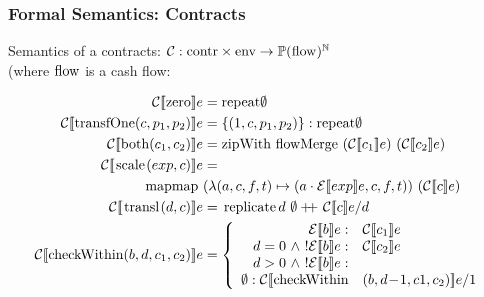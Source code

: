\documentclass[xcolor=dvipsnames,11pt]{beamer}
\newcommand{\ttt}[1]{\mbox{\cd{#1}}}
\newcommand{\zero}{\ttt{zero}}
\newcommand{\transfOne}{\ttt{transfOne}}
\newcommand{\scale}{\ttt{scale}}
\newcommand{\transl}{\ttt{transl}}
\newcommand{\both}{\ttt{both}}
\newcommand{\checkWithin}{\ttt{checkWithin}}
\begin{document}
\begin{frame}
    \frametitle{Formal Semantics: Contracts}

Semantics of a contracts: $ \mathcal{C} : \ttt{contr} \times \ttt{env} 
          \rightarrow \mathbb{P}(\ttt{flow})^\mathbb{N}$\\
{\footnotesize
(where $\ttt{flow}$ is a cash flow: 
}

{\footnotesize
\begin{align*}
\csem{\zero}{e}{\ttt{repeat} \emptyset}\\
\csem{\transfOne(c,p_1,p_2)}{e}{\{(1,c,p_1,p_2)\} : \ttt{repeat} \emptyset }\\
\csem{\both(c_1,c_2)}{e}{\ttt{zipWith flowMerge }\ (\mathcal{C}\sem{c_1}e)\ (\mathcal{C}\sem{c_2}e)}\\
\csem{\scale(exp,c)}{e}{}\\
\ttt{mapmap}\ &(\lambda (a,c,f,t)\mapsto(a\cdot\mathcal{E}\sem{exp}e,c,f,t))\ (\mathcal{C}\sem{c}e)\\
\csem{\transl(d,c)}{e}{\ttt{replicate }d \ \emptyset +\!\!\!+\  \mathcal{C}\sem{c}e/d}\\
\csem{\checkWithin(b,d,c_1,c_2)}{e}{
\left \{
\begin{array}{rl}
\mathcal{E}\sem{b}e: & \mathcal{C}\sem{c_1}e\\
d = 0\ \wedge\ !\mathcal{E}\sem{b}e: & \mathcal{C}\sem{c_2}e\\
d > 0\ \wedge\ !\mathcal{E}\sem{b}e:\\
\emptyset : \mathcal{C}\sem{\checkWithin&(b,d\!-\!1,c1,c_2)}e/1\\
\end{array}\right.
}
\end{align*}
}

\end{frame}
\end{document}
